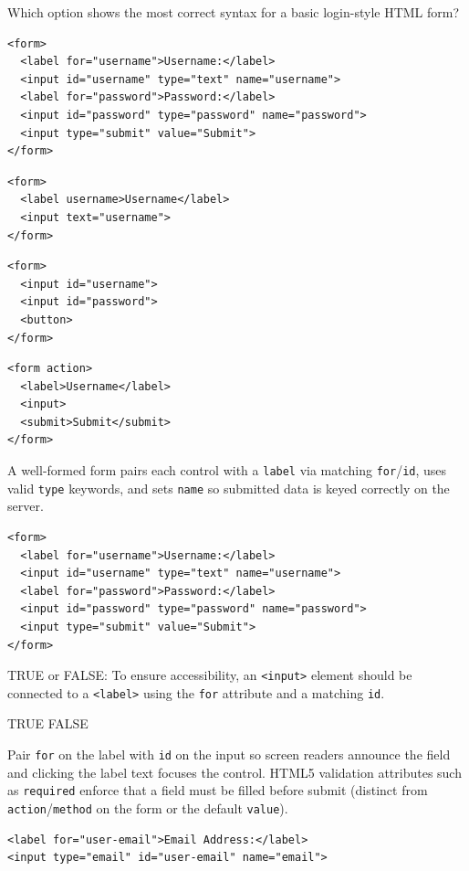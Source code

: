 \question[4]
Which option shows the most correct syntax for a basic login-style HTML form?
\begin{choices}
  \CorrectChoice
\begin{lstlisting}[style=htmlinline]
<form>
  <label for="username">Username:</label>
  <input id="username" type="text" name="username">
  <label for="password">Password:</label>
  <input id="password" type="password" name="password">
  <input type="submit" value="Submit">
</form>
\end{lstlisting}
  \choice
\begin{lstlisting}[style=htmlinline]
<form>
  <label username>Username</label>
  <input text="username">
</form>
\end{lstlisting}
  \choice
\begin{lstlisting}[style=htmlinline]
<form>
  <input id="username">
  <input id="password">
  <button>
</form>
\end{lstlisting}
  \choice
\begin{lstlisting}[style=htmlinline]
<form action>
  <label>Username</label>
  <input>
  <submit>Submit</submit>
</form>
\end{lstlisting}
\end{choices}
\begin{solution}
  A well-formed form pairs each control with a \texttt{label} via matching \texttt{for}/\texttt{id}, uses valid \texttt{type} keywords, and sets \texttt{name} so submitted data is keyed correctly on the server.
\begin{lstlisting}[style=htmlinline]
<form>
  <label for="username">Username:</label>
  <input id="username" type="text" name="username">
  <label for="password">Password:</label>
  <input id="password" type="password" name="password">
  <input type="submit" value="Submit">
</form>
\end{lstlisting}
\end{solution}

\question[4]
TRUE or FALSE: To ensure accessibility, an \texttt{<input>} element should be connected to a \texttt{<label>} using the \texttt{for} attribute and a matching \texttt{id}.
\begin{choices}
  \CorrectChoice TRUE
  \choice FALSE
\end{choices}
\begin{solution}
  Pair \texttt{for} on the label with \texttt{id} on the input so screen readers announce the field and clicking the label text focuses the control. HTML5 validation attributes such as \lstinline[style=htmlinline]|required| enforce that a field must be filled before submit (distinct from \lstinline[style=htmlinline]|action|/\lstinline[style=htmlinline]|method| on the form or the default \lstinline[style=htmlinline]|value|).
\begin{lstlisting}[style=htmlinline]
<label for="user-email">Email Address:</label>
<input type="email" id="user-email" name="email">
\end{lstlisting}
\end{solution}

